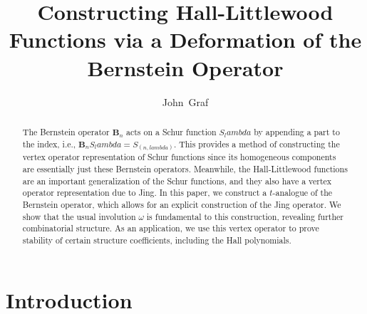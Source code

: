 \documentclass[12pt]{amsart}%
\def\lambda{lambda}%
\theoremstyle{remark}
\theoremstyle{definition}
\begin{document}
\title[Deformation of the Bernstein Operator]{Constructing Hall-Littlewood Functions via a Deformation of the Bernstein Operator}

\author{John~Graf}
\address{Department of Mathematical Sciences, University of Delaware, Newark, DE 19716, USA}

    
    \begin{abstract}
        The Bernstein operator $\mathbf{B}_n$ acts on a Schur function $S_\lambda$ by appending a part to the index, i.e., $\mathbf{B}_n S_\lambda=S_{(n,\lambda)}$. This provides a method of constructing the vertex operator representation of Schur functions since its homogeneous components are essentially just these Bernstein operators. Meanwhile, the Hall-Littlewood functions are an important generalization of the Schur functions, and they also have a vertex operator representation due to Jing. In this paper, we construct a $t$-analogue of the Bernstein operator, which allows for an explicit construction of the Jing operator. We show that the usual involution $\omega$ is fundamental to this construction, revealing further combinatorial structure. As an application, we use this vertex operator to prove stability of certain structure coefficients, including the Hall polynomials.
    \end{abstract}

    \maketitle
    

    \section{Introduction}
\end{document}
